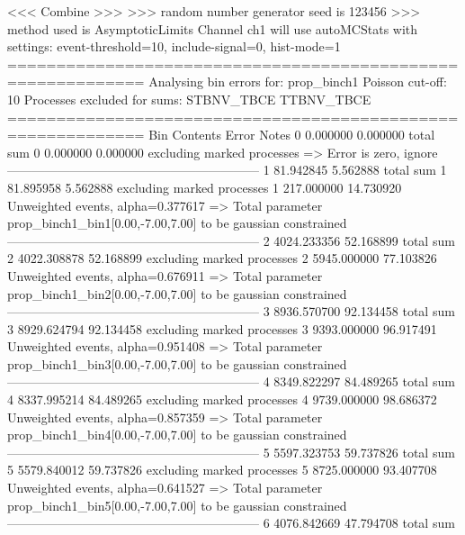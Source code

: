  <<< Combine >>> 
>>> random number generator seed is 123456
>>> method used is AsymptoticLimits
Channel ch1 will use autoMCStats with settings: event-threshold=10, include-signal=0, hist-mode=1
============================================================
Analysing bin errors for: prop_binch1
Poisson cut-off: 10
Processes excluded for sums: STBNV_TBCE TTBNV_TBCE
============================================================
Bin        Contents        Error           Notes                         
0          0.000000        0.000000        total sum                     
0          0.000000        0.000000        excluding marked processes    
  => Error is zero, ignore      
------------------------------------------------------------
1          81.942845       5.562888        total sum                     
1          81.895958       5.562888        excluding marked processes    
1          217.000000      14.730920       Unweighted events, alpha=0.377617
  => Total parameter prop_binch1_bin1[0.00,-7.00,7.00] to be gaussian constrained
------------------------------------------------------------
2          4024.233356     52.168899       total sum                     
2          4022.308878     52.168899       excluding marked processes    
2          5945.000000     77.103826       Unweighted events, alpha=0.676911
  => Total parameter prop_binch1_bin2[0.00,-7.00,7.00] to be gaussian constrained
------------------------------------------------------------
3          8936.570700     92.134458       total sum                     
3          8929.624794     92.134458       excluding marked processes    
3          9393.000000     96.917491       Unweighted events, alpha=0.951408
  => Total parameter prop_binch1_bin3[0.00,-7.00,7.00] to be gaussian constrained
------------------------------------------------------------
4          8349.822297     84.489265       total sum                     
4          8337.995214     84.489265       excluding marked processes    
4          9739.000000     98.686372       Unweighted events, alpha=0.857359
  => Total parameter prop_binch1_bin4[0.00,-7.00,7.00] to be gaussian constrained
------------------------------------------------------------
5          5597.323753     59.737826       total sum                     
5          5579.840012     59.737826       excluding marked processes    
5          8725.000000     93.407708       Unweighted events, alpha=0.641527
  => Total parameter prop_binch1_bin5[0.00,-7.00,7.00] to be gaussian constrained
------------------------------------------------------------
6          4076.842669     47.794708       total sum                     
